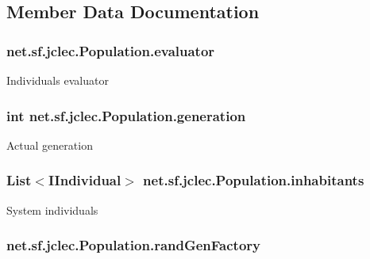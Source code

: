 \subsection{Member Data Documentation}
\hypertarget{classnet_1_1sf_1_1jclec_1_1_population_aa075ac6a98248a90051eca5f867a2447}{
\subsubsection[{evaluator}]{ net.\-sf.\-jclec.\-Population.\-evaluator\hspace{0.3cm}{\ttfamily [protected]}}}\label{classnet_1_1sf_1_1jclec_1_1_population_aa075ac6a98248a90051eca5f867a2447}
Individuals evaluator \hypertarget{classnet_1_1sf_1_1jclec_1_1_population_aba01ead036006d560073215fdde63f9b}{
\subsubsection[{generation}]{\setlength{\rightskip}{0pt plus 5cm}int net.\-sf.\-jclec.\-Population.\-generation\hspace{0.3cm}{\ttfamily [protected]}}}\label{classnet_1_1sf_1_1jclec_1_1_population_aba01ead036006d560073215fdde63f9b}
Actual generation \hypertarget{classnet_1_1sf_1_1jclec_1_1_population_a97d1e24a033dc306b9fad594353cf9db}{
\subsubsection[{inhabitants}]{\setlength{\rightskip}{0pt plus 5cm}List$<${\bf I\-Individual}$>$ net.\-sf.\-jclec.\-Population.\-inhabitants\hspace{0.3cm}{\ttfamily [protected]}}}\label{classnet_1_1sf_1_1jclec_1_1_population_a97d1e24a033dc306b9fad594353cf9db}
System individuals \hypertarget{classnet_1_1sf_1_1jclec_1_1_population_afadd9ab271fa5cc1910a2eaef02d70fe}{
\subsubsection[{rand\-Gen\-Factory}]{ net.\-sf.\-jclec.\-Population.\-rand\-Gen\-Factory\hspace{0.3cm}{\ttfamily [protected]}}}\label{classnet_1_1sf_1_1jclec_1_1_population_afadd9ab271fa5cc1910a2eaef02d70fe}
